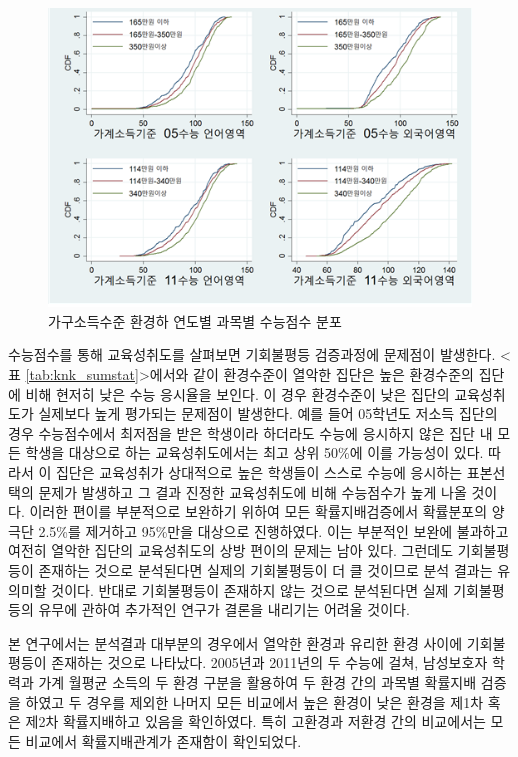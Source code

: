 \begin{figure}
    \centering
    \includegraphics[width=140mm]{figure/knk_cdf_byicm.png}
    \caption{가구소득수준 환경하 연도별 과목별 수능점수 분포}
    \label{fig:knk_cdf_byicm}
\end{figure}



수능점수를 통해 교육성취도를 살펴보면 기회불평등 검증과정에 문제점이 발생한다.
<표 \ref{tab:knk_sumstat}>에서와 같이 환경수준이 열악한 집단은 높은 환경수준의 집단에 비해 현저히 낮은 수능 응시율을 보인다.
이 경우 환경수준이 낮은 집단의 교육성취도가 실제보다 높게 평가되는 문제점이 발생한다.
예를 들어 05학년도 저소득 집단의 경우 수능점수에서 최저점을 받은 학생이라 하더라도 수능에 응시하지 않은 집단 내 모든 학생을 대상으로 하는 교육성취도에서는 최고 상위 50\%에 이를 가능성이 있다.
따라서 이 집단은 교육성취가 상대적으로 높은 학생들이 스스로 수능에 응시하는 표본선택의 문제가 발생하고 그 결과 진정한 교육성취도에 비해 수능점수가 높게 나올 것이다.
이러한 편이를 부분적으로 보완하기 위하여 모든 확률지배검증에서 확률분포의 양극단 2.5\%를 제거하고 95\%만을 대상으로 진행하였다.
이는 부분적인 보완에 불과하고 여전히 열악한 집단의 교육성취도의 상방 편이의 문제는 남아 있다.
그런데도 기회불평등이 존재하는 것으로 분석된다면 실제의 기회불평등이 더 클 것이므로 분석 결과는 유의미할 것이다.
반대로 기회불평등이 존재하지 않는 것으로 분석된다면 실제 기회불평등의 유무에 관하여 추가적인 연구가 결론을 내리기는 어려울 것이다.

본 연구에서는 분석결과 대부분의 경우에서 열악한 환경과 유리한 환경 사이에 기회불평등이 존재하는 것으로 나타났다.
2005년과 2011년의 두 수능에 걸쳐, 남성보호자 학력과 가계 월평균 소득의 두 환경 구분을 활용하여 두 환경 간의 과목별 확률지배 검증을 하였고 두 경우를 제외한 나머지 모든 비교에서 높은 환경이 낮은 환경을 제1차 혹은 제2차 확률지배하고 있음을 확인하였다.
특히 고환경과 저환경 간의 비교에서는 모든 비교에서 확률지배관계가 존재함이 확인되었다.

